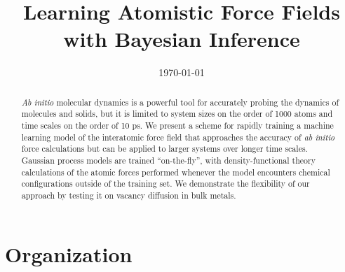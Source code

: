 \documentclass[%
superscriptaddress,
preprint,
amsmath,amssymb,
aps,
prl,
]{revtex4-1}
\begin{document}
\title{Learning Atomistic Force Fields with Bayesian Inference}






\date{\today}

\begin{abstract}
\textit{Ab initio} molecular dynamics is a powerful tool for
accurately probing the dynamics of molecules and solids, but it is limited
to system sizes on the order of 1000 atoms and time scales on the order of
10 ps. We present a scheme for rapidly training a machine learning 
model of the interatomic force field that approaches the accuracy of \textit{ab initio} force calculations but can be applied to larger systems over longer time scales. Gaussian process models are trained “on-the-fly”, with density-functional theory calculations of the atomic forces performed whenever the model encounters chemical configurations outside of the training set. We demonstrate the flexibility of our approach by testing it on vacancy diffusion in bulk metals.
\end{abstract}

\maketitle

\section{Organization}
\end{document}
